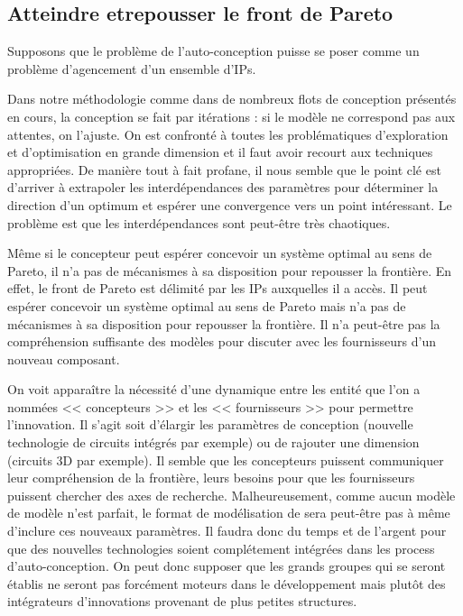 \documentclass[11pt]{article}
\begin{document}
\subsection{Atteindre etrepousser le front de Pareto}

Supposons que le problème de l'auto-conception puisse se poser comme un problème d'agencement d'un ensemble d'IPs.

Dans notre méthodologie comme dans de nombreux flots de conception présentés en cours, la conception se fait par itérations : si le modèle ne correspond pas aux attentes, on l'ajuste. On est confronté à toutes les problématiques d'exploration et d'optimisation en grande dimension et il faut avoir recourt aux techniques appropriées. De manière tout à fait profane, il nous semble que le point clé est d'arriver à extrapoler les interdépendances des paramètres pour déterminer la direction d'un optimum et espérer une convergence vers un point intéressant. Le problème est que les interdépendances sont peut-être très chaotiques.

Même si le concepteur peut espérer concevoir un système optimal au sens de Pareto, il n'a pas de mécanismes à sa disposition pour repousser la frontière. En effet, le front de Pareto est délimité par les IPs auxquelles il a accès. Il peut espérer concevoir un système optimal au sens de Pareto mais n'a pas de mécanismes à sa disposition pour repousser la frontière. Il n'a peut-être pas la compréhension suffisante des modèles pour discuter avec les fournisseurs d'un nouveau composant.

On voit apparaître la nécessité d'une dynamique entre les entité que l'on a nommées << concepteurs >> et les << fournisseurs >> pour permettre l'innovation. Il s'agit soit d'élargir les paramètres de conception (nouvelle technologie de circuits intégrés par exemple) ou de rajouter une dimension (circuits 3D par exemple). Il semble que les concepteurs puissent communiquer leur compréhension de la frontière, leurs besoins pour que les fournisseurs puissent chercher des axes de recherche. Malheureusement, comme aucun modèle de modèle n'est parfait, le format de modélisation de sera peut-être pas à même d'inclure ces nouveaux paramètres. Il faudra donc du temps et de l'argent pour que des nouvelles technologies soient complétement intégrées dans les process d'auto-conception. On peut donc supposer que les grands groupes qui se seront établis ne seront pas forcément moteurs dans le développement mais plutôt des intégrateurs d'innovations provenant de plus petites structures.
\end{document}
